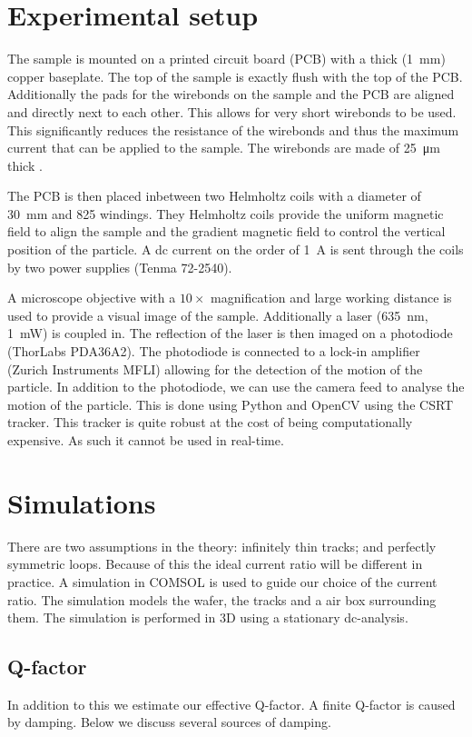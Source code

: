 \section{Experimental setup}
The sample is mounted on a printed circuit board (PCB) with a thick (\qty{1}{\mm}) copper baseplate. The top of the sample is exactly flush with the top of the PCB. Additionally the pads for the wirebonds on the sample and the PCB are aligned and directly next to each other. This allows for very short wirebonds to be used. This significantly reduces the resistance of the wirebonds and thus the maximum current that can be applied to the sample. The wirebonds are made of \qty{25}{\um} thick .

The PCB is then placed inbetween two Helmholtz coils with a diameter of \qty{30}{\mm} and 825 windings. They Helmholtz coils provide the uniform magnetic field to align the sample and the gradient magnetic field to control the vertical position of the particle. A dc current on the order of \qty{1}{\ampere} is sent through the coils by two power supplies (Tenma 72-2540).

A microscope objective with a $10\times$ magnification and large working distance is used to provide a visual image of the sample. Additionally a laser (\qty{635}{\nm}, \qty{1}{\milli\watt}) is coupled in. The reflection of the laser is then imaged on a photodiode (ThorLabs PDA36A2). The photodiode is connected to a lock-in amplifier (Zurich Instruments MFLI) allowing for the detection of the motion of the particle. In addition to the photodiode, we can use the camera feed to analyse the motion of the particle. This is done using Python and OpenCV using the CSRT tracker. This tracker is quite robust at the cost of being computationally expensive. As such it cannot be used in real-time.

\section{Simulations}
There are two assumptions in the theory: infinitely thin tracks; and perfectly symmetric loops. Because of this the ideal current ratio will be different in practice. A simulation in COMSOL is used to guide our choice of the current ratio. The simulation models the  wafer, the  tracks and a air box surrounding them. The simulation is performed in 3D using a stationary dc-analysis.

\subsection{Q-factor}
\label{subsec:q-factor}
In addition to this we estimate our effective Q-factor. A finite Q-factor is caused by damping. Below we discuss several sources of damping.

